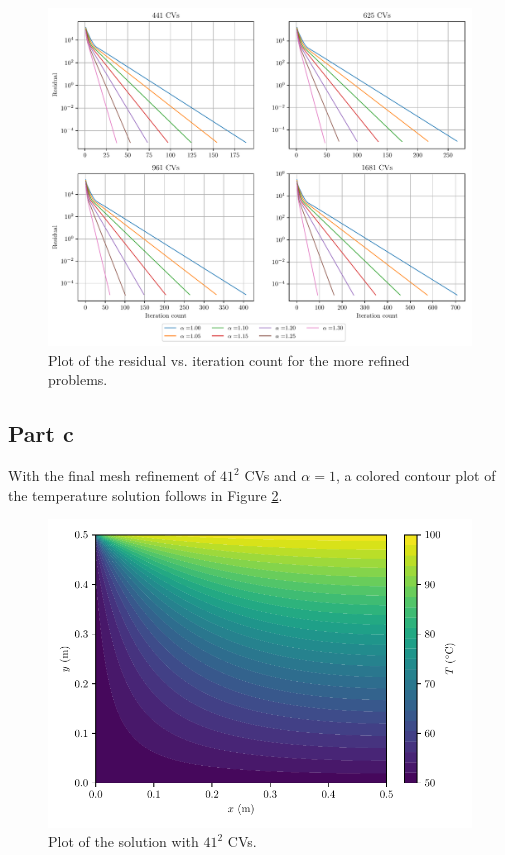 \documentclass{article}
\begin{document}
\begin{figure}[H]
	\centering
	\includegraphics[width=\linewidth]{../results/b-iterations}
	\caption{Plot of the residual vs. iteration count for the more refined problems.}
	\label{fig:b-iterations}
\end{figure}

\subsection*{Part c}

With the final mesh refinement of $41^2$ CVs and $\alpha = 1$, a colored contour plot of the temperature solution follows in Figure \ref{fig:c}.

\begin{figure}[H]
	\centering
	\includegraphics[width=0.7\linewidth]{../results/c}
	\caption{Plot of the solution with $41^2$ CVs.}
	\label{fig:c}
\end{figure}
\end{document}
